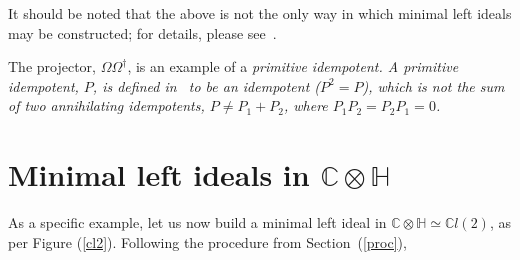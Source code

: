 \documentclass[letterpaper,12pt,titlepage,oneside,final]{book}
\newcommand{\CH}{\mathbb{C}\otimes\mathbb{H}}
\newcommand{\RCHO}{\mathbb{R}\otimes\mathbb{C}\otimes\mathbb{H}\otimes\mathbb{O}}
\newcommand{\CLtwo}{\mathbb{C}l(2)}
\newcommand{\CLn}{\mathbb{C}l(n)}
\begin{document}
It should be noted that the above is not the only way in which minimal left ideals may be constructed; for details, please see~\cite{ablam}. 

The projector, $\Omega\Omega^{\dagger}$, is an example of a \it primitive idempotent. \rm   A primitive idempotent, $P$, is defined in~\cite{loun} to be an idempotent ($P^2=P$), which is not the sum of two annihilating idempotents, $P\neq P_1+P_2$, where $P_1P_2 = P_2P_1 = 0$.







\section{Minimal left ideals in $\CH$  }

As a specific example, let us now build a minimal left ideal in $\CH\simeq\CLtwo$, as per Figure (\ref{cl2}).   Following the procedure from Section~(\ref{proc}),
\end{document}
